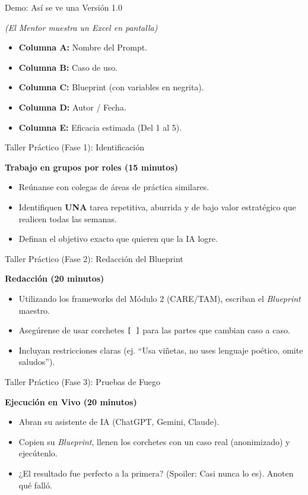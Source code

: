 \documentclass[aspectratio=169]{beamer}
\begin{document}
\begin{frame}{Demo: Así se ve una Versión 1.0}

\textit{(El Mentor muestra un Excel en pantalla)}
\begin{itemize}
  \item \textbf{Columna A:} Nombre del Prompt.
  \item \textbf{Columna B:} Caso de uso.
  \item \textbf{Columna C:} Blueprint (con variables en negrita).
  \item \textbf{Columna D:} Autor / Fecha.
  \item \textbf{Columna E:} Eficacia estimada (Del 1 al 5).
\end{itemize}
\end{frame}

\begin{frame}{Taller Práctico (Fase 1): Identificación}

\textbf{Trabajo en grupos por roles (15 minutos)}
\begin{itemize}
  \item Reúnanse con colegas de áreas de práctica similares.
  \item Identifiquen \textbf{UNA} tarea repetitiva, aburrida y de bajo valor estratégico que realicen todas las semanas.
  \item Definan el objetivo exacto que quieren que la IA logre.
\end{itemize}
\end{frame}

\begin{frame}{Taller Práctico (Fase 2): Redacción del Blueprint}

\textbf{Redacción (20 minutos)}
\begin{itemize}
  \item Utilizando los frameworks del Módulo 2 (CARE/TAM), escriban el \textit{Blueprint} maestro.
  \item Asegúrense de usar corchetes \texttt{[ ]} para las partes que cambian caso a caso.
  \item Incluyan restricciones claras (ej. ``Usa viñetas, no uses lenguaje poético, omite saludos'').
\end{itemize}
\end{frame}

\begin{frame}{Taller Práctico (Fase 3): Pruebas de Fuego}

\textbf{Ejecución en Vivo (20 minutos)}
\begin{itemize}
  \item Abran su asistente de IA (ChatGPT, Gemini, Claude).
  \item Copien su \textit{Blueprint}, llenen los corchetes con un caso real (anonimizado) y ejecútenlo.
  \item ¿El resultado fue perfecto a la primera? (Spoiler: Casi nunca lo es). Anoten qué falló.
\end{itemize}
\end{frame}
\end{document}
